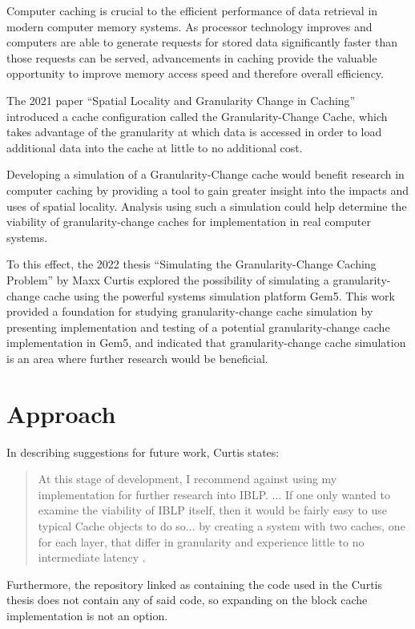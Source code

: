 \documentclass[12pt,twoside]{reedthesis}
\begin{document}
Computer caching is crucial to the efficient performance of data retrieval in modern computer memory systems. As processor technology improves and computers are able to generate requests for stored data significantly faster than those requests can be served, advancements in caching provide the valuable opportunity to improve memory access speed and therefore overall efficiency.

The 2021 paper ``Spatial Locality and Granularity Change in Caching'' introduced a cache configuration called the Granularity-Change Cache, which takes advantage of the granularity at which data is accessed in order to load additional data into the cache at little to no additional cost.

Developing a simulation of a Granularity-Change cache would benefit research in computer caching by providing a tool to gain greater insight into the impacts and uses of spatial locality. Analysis using such a simulation could help determine the viability of granularity-change caches for implementation in real computer systems.

To this effect, the 2022 thesis ``Simulating the Granularity-Change Caching Problem'' by Maxx Curtis explored the possibility of simulating a granularity-change cache using the powerful systems simulation platform Gem5. This work provided a foundation for studying granularity-change cache simulation by presenting implementation and testing of a potential granularity-change cache implementation in Gem5, and indicated that granularity-change cache simulation is an area where further research would be beneficial.

\section{Approach}

	In describing suggestions for future work, Curtis states: \begin{quote}
		At this stage of development, I recommend against using my implementation for further research into IBLP. ... If one only wanted to examine the viability of IBLP itself, then it would be fairly easy to use typical Cache objects to do so... by creating a system with two caches, one for each layer, that differ in granularity and experience little to no intermediate latency \cite{curtis}.
	\end{quote}

	Furthermore, the repository linked as containing the code used in the Curtis thesis does not contain any of said code, so expanding on the block cache implementation is not an option.
\end{document}
